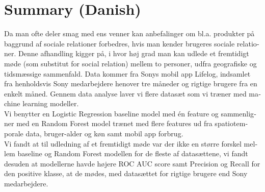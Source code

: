 \chapter{Summary (Danish)}
\begin{otherlanguage}{danish}

Da man ofte deler smag med ens venner kan anbefalinger om bl.a. produkter på baggrund af sociale relationer forbedres, hvis man kender brugeres sociale relationer.
Denne afhandling kigger på, i hvor høj grad man kan udlede et fremtidigt møde (som substitut for social relation) mellem to personer, udfra geografiske og tidsmæssige sammenfald.
Data kommer fra Sonys mobil app Lifelog, indsamlet fra henholdsvis Sony medarbejdere henover tre måneder og rigtige brugere fra en enkelt måned.
Gennem data analyse laver vi flere datasæt som vi træner med machine learning modeller.\\
Vi benytter en Logistic Regression baseline model med én feature og sammenligner med en Random Forest model trænet med flere features ud fra spatiotemporale data, bruger-alder og køn samt mobil app forbrug. \\
Vi fandt at til udledning af et fremtidigt møde var der ikke en større forskel mellem baseline og Random Forest modellen for de fleste af datasættene, vi fandt desuden at modellerne havde højere ROC AUC score samt Precision og Recall for den positive klasse, at de mødes, med datasættet for rigtige brugere end Sony medarbejdere.

\end{otherlanguage}